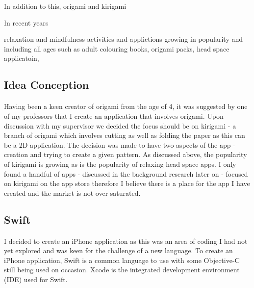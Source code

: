 \documentclass[11pt]{article}
\begin{document}
                In addition to this,  origami and kirigami 
            
            
    
                In recent years
            
                relaxation and mindfulness activities and applictions growing in popularity and including all ages such as adult colouring books, origami packs, head space applicatoin, 
                
        
        \subsection{Idea Conception}
            
                    \paragraph{} 
                        Having been a keen creator of origami from the age of 4, it was suggested by one of my professors that I create an application that involves origami. Upon discussion with my supervisor we decided the focus should be on kirigami - a branch of origami which involves cutting as well as folding the paper as this can be a 2D application. The decision was made to have two aspects of the app - creation and trying to create a given pattern. As discussed above, the popularity of kirigami is growing as is the popularity of relaxing head space apps. I only found a handful of apps - discussed in the background research later on - focused on kirigami on the app store therefore I believe there is a place for the app I have created and the market is not over saturated. 
                        
                        \subsection{Swift}
               
                \paragraph{} 
                    I decided to create an iPhone application as this was an area of coding I had not yet explored and was keen for the challenge of a new language. To create an iPhone application, Swift is a common language to use with some Objective-C still being used on occasion.  
                    Xcode is the integrated development environment (IDE) used for Swift.
        
\end{document}
